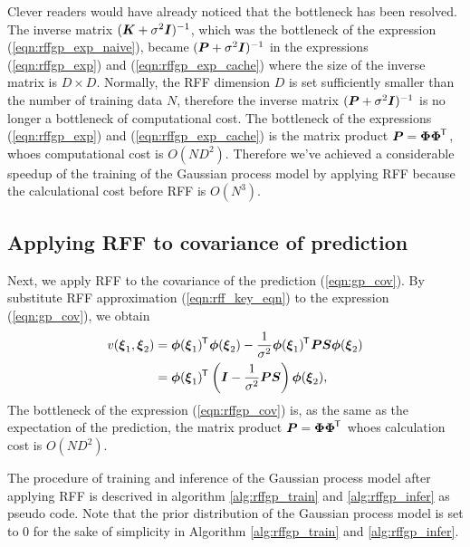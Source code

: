 \documentclass[twocolumn, a4paper, 10pt]{article}
\begin{document}
Clever readers would have already noticed that the bottleneck has been resolved.
The inverse matrix $(\boldsymbol{K} + \sigma^2 \boldsymbol{I})^{-1}$, which was the bottleneck of
the expression (\ref{eqn:rffgp_exp_naive}), became $(\boldsymbol{P} + \sigma^2 \boldsymbol{I})^{-1}$
in the expressions (\ref{eqn:rffgp_exp}) and (\ref{eqn:rffgp_exp_cache}) where the size of
the inverse matrix is $D \times D$. Normally, the RFF dimension $D$ is set sufficiently
smaller than the number of training data $N$, therefore the inverse matrix
$(\boldsymbol{P} + \sigma^2 \boldsymbol{I})^{-1}$ is no longer a bottleneck of computational cost.
The bottleneck of the expressions (\ref{eqn:rffgp_exp}) and (\ref{eqn:rffgp_exp_cache})
is the matrix product $\boldsymbol{P} = \boldsymbol{\Phi \Phi}^{\mkern-1.5mu\mathsf{T}}\hspace{0.5pt}$, whoes computational cost is $O(ND^2)$.
Therefore we've achieved a considerable speedup of the training of the Gaussian process model
by applying RFF because the calculational cost before RFF is $O(N^3)$.

\subsection{Applying RFF to covariance of prediction}

Next, we apply RFF to the covariance of the prediction (\ref{eqn:gp_cov}).
By substitute RFF approximation (\ref{eqn:rff_key_eqn}) to the expression (\ref{eqn:gp_cov}),
we obtain
\begin{align}
    v (\boldsymbol{\xi}_1, \boldsymbol{\xi}_2)
    & = \boldsymbol{\phi} (\boldsymbol{\xi}_1)^{\mkern-1.5mu\mathsf{T}}\hspace{0.5pt} \boldsymbol{\phi} (\boldsymbol{\xi}_2)
    - \frac{1}{\sigma^2} \boldsymbol{\phi} (\boldsymbol{\xi}_1)^{\mkern-1.5mu\mathsf{T}}\hspace{0.5pt} \boldsymbol{PS} \boldsymbol{\phi} (\boldsymbol{\xi}_2) \notag \\
    & = \boldsymbol{\phi} (\boldsymbol{\xi}_1)^{\mkern-1.5mu\mathsf{T}}\hspace{0.5pt}
    \left( \boldsymbol{I} - \frac{1}{\sigma^2} \boldsymbol{PS} \right)
    \boldsymbol{\phi} (\boldsymbol{\xi}_2),
    \label{eqn:rffgp_cov}
\end{align}
The bottleneck of the expression (\ref{eqn:rffgp_cov}) is, as the same as the expectation of the
prediction, the matrix product $\boldsymbol{P} = \boldsymbol{\Phi \Phi}^{\mkern-1.5mu\mathsf{T}}\hspace{0.5pt}$ whoes calculation cost is $O(ND^2)$.

The procedure of training and inference of the Gaussian process model after applying RFF is
descrived in algorithm \ref{alg:rffgp_train} and \ref{alg:rffgp_infer} as pseudo code.
Note that the prior distribution of the Gaussian process model is set to 0 for the sake of
simplicity in Algorithm \ref{alg:rffgp_train} and \ref{alg:rffgp_infer}.
\end{document}
